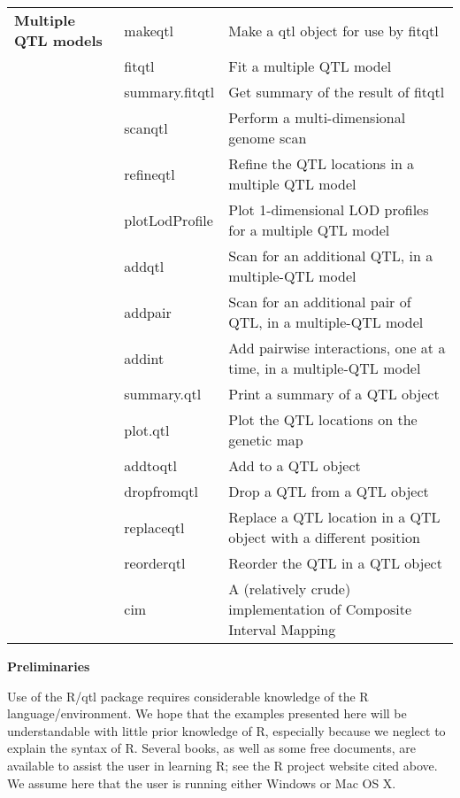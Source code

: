 \documentclass[10pt,letterpaper]{article}
\begin{document}
\begin{tabular}{lll}
\textbf{Multiple QTL models} 
& makeqtl & Make a qtl object for use by fitqtl \\ 
& fitqtl & Fit a multiple QTL model \\
& summary.fitqtl & Get summary of the result of fitqtl \\
& scanqtl & Perform a multi-dimensional genome scan \\
& refineqtl & Refine the QTL locations in a multiple QTL model \\
& plotLodProfile & Plot 1-dimensional LOD profiles for a multiple QTL
model \\
& addqtl & Scan for an additional QTL, in a 
multiple-QTL model \\
& addpair & Scan for an additional pair of QTL, in a 
multiple-QTL model \\
& addint & Add pairwise interactions, 
one at a time, in a multiple-QTL model \\
& summary.qtl & Print a summary of a QTL object \\
& plot.qtl & Plot the QTL locations on the genetic map \\
& addtoqtl & Add to a QTL object \\
& dropfromqtl & Drop a QTL from a QTL object \\
& replaceqtl & Replace a QTL location in a QTL object with a different
position \\
& reorderqtl & Reorder the QTL in a QTL object \\
& cim & A (relatively crude) implementation of Composite Interval
Mapping \\

\hline
\end{tabular} 
\newpage






\noindent \textbf{Preliminaries} \vspace{6pt}

\noindent Use of the R/qtl package requires considerable knowledge of
the R language/environment.  We hope that the examples presented here
will be understandable with little prior knowledge of R, especially
because we neglect to explain the syntax of R.  Several books, as well
as some free documents, are available to assist the user in learning
R; see the R project website cited above.  We assume here that the
user is running either Windows or Mac OS X.
\end{document}
